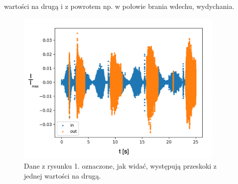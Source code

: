\documentclass[polish]{article}
\begin{document}
wartości na drugą i z powrotem np. w połowie brania wdechu, wydychania.
\begin{figure}[H]
	\centering
	\includegraphics[width=10cm]{przeskakiwanie_ozn}
  	\caption{Dane z rysunku 1. oznaczone, jak widać, występują przeskoki z jednej wartości na drugą.}
\end{figure}
\end{document}
